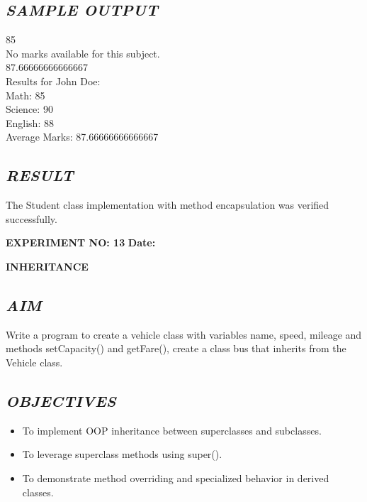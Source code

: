\documentclass[11pt,a4paper]{article}
\begin{document}
\subsection*{\textit{SAMPLE OUTPUT}}
\begin{tcolorbox}[colback=black!85,colframe=navyblue,title=\textbf{Terminal Output},coltitle=white,fonttitle=\bfseries\small]
\small\ttfamily\color{green!30!white}
85\\
No marks available for this subject.\\
87.66666666666667\\
Results for John Doe:\\
Math: 85\\
Science: 90\\
English: 88\\
Average Marks: 87.66666666666667
\end{tcolorbox}

\subsection*{\textit{RESULT}}
The Student class implementation with method encapsulation was verified successfully.

\newpage

\noindent
\textbf{\large EXPERIMENT NO: 13} \hfill \textbf{\large Date: \underline{\hspace{3cm}}}

\vspace{0.2cm}
\begin{center}
{\Huge \textbf{\textcolor{navyblue}{INHERITANCE}}}
\end{center}
\vspace{0.3cm}

\subsection*{\textit{AIM}}
Write a program to create a vehicle class with variables name, speed, mileage and methods setCapacity() and getFare(), create a class bus that inherits from the Vehicle class.

\subsection*{\textit{OBJECTIVES}}
\begin{itemize}
  \item To implement OOP inheritance between superclasses and subclasses.
  \item To leverage superclass methods using super().
  \item To demonstrate method overriding and specialized behavior in derived classes.
\end{itemize}
\end{document}
